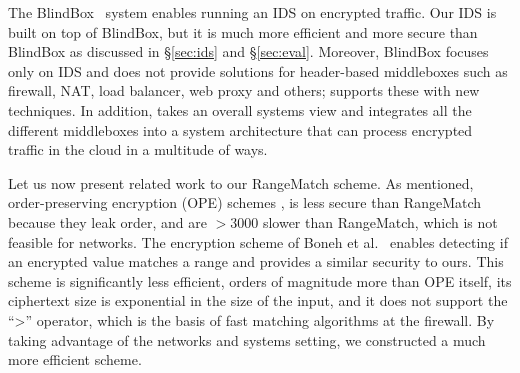 The BlindBox~\cite{blindbox} system enables running an IDS on encrypted traffic. Our IDS is built on top of BlindBox, but it is much more efficient and more secure than BlindBox as discussed in \S\ref{sec:ids} and \S\ref{sec:eval}. Moreover, BlindBox focuses only on IDS and does not provide solutions for header-based middleboxes such as firewall, NAT, load balancer, web proxy and others;  \sys supports these with new techniques. In addition, \sys takes an overall systems view and integrates all the different middleboxes into a system architecture that can process encrypted traffic in the cloud in a multitude of ways.




Let us now present related work to our RangeMatch scheme. 
As  mentioned, order-preserving encryption  (OPE) schemes \cite{boldyreva:ope}, \cite{popa:mope} is less secure than RangeMatch because they leak order, and are $>3000$ slower than RangeMatch, which is not feasible for networks.
The  encryption scheme of Boneh et al.~\cite{BonehRange} enables detecting if an encrypted value matches a range and provides a similar security to ours. 
This scheme is significantly less efficient, orders of magnitude more than OPE itself, its ciphertext size is exponential in the size of the input, and it does not support the ``>'' operator, which is the basis of fast matching algorithms at the firewall. By taking advantage of the networks and systems setting, we constructed  a much more efficient scheme. 

